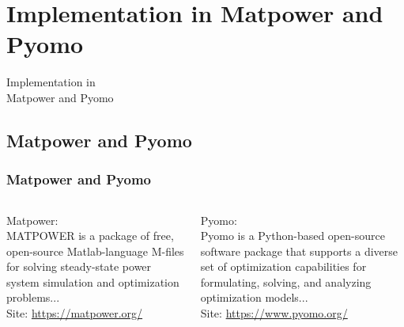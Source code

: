 \documentclass[
	11pt, %
	aspectratio=169, %
]{beamer}
\begin{document}
\section{Implementation in Matpower and Pyomo}

\begin{frame}[plain] %
	\begin{center}
		{\Huge Implementation in \\Matpower and Pyomo}
		
		\bigskip\bigskip %
		
	\end{center}
\end{frame}

\subsection{Matpower and Pyomo}
\begin{frame}
	\frametitle{Matpower and Pyomo}

	\begin{columns}
		
		\begin{column}{0.5\textwidth}
			Matpower: \\
			MATPOWER is a package of free, open-source Matlab-language M-files for solving steady-state power system simulation and optimization problems...\parencite{5491276}\\
			Site: \url{https://matpower.org/}
		\end{column}
		
		\begin{column}{0.5\textwidth}
			Pyomo:\\ Pyomo is a Python-based open-source software package that supports a diverse set of optimization capabilities for formulating, solving, and analyzing optimization models...\parencite{bynum2021pyomo}\\
			Site: \url{https://www.pyomo.org/}
		\end{column}



	\end{columns}

	
\end{frame}

\end{document}
